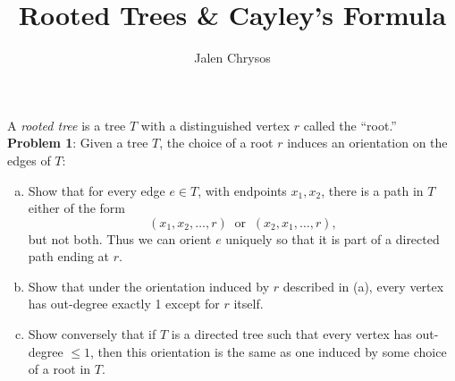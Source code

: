 \documentclass{amsart}
\author{Jalen Chrysos}
\title{Rooted Trees \& Cayley's Formula}
\begin{document}
	\maketitle 

%	
%	
%	
%	


	A \textit{rooted tree} is a tree $T$ with a distinguished vertex $r$ called the ``root.'' \\
	
	\noindent \textbf{Problem 1}: Given a tree $T$, the choice of a root $r$ induces an orientation on the edges of $T$: 
	\begin{enumerate}[(a)]
		\item Show that for every edge $e\in T$, with endpoints $x_1,x_2$, there is a path in $T$ either of the form
		$$(x_1,x_2,\dots,r) \;\; \text{or} \;\; (x_2,x_1,\dots,r),$$
		but not both. Thus we can orient $e$ uniquely so that it is part of a directed path ending at $r$.
		\item Show that under the orientation induced by $r$ described in (a), every vertex has out-degree exactly 1 except for $r$ itself.
		\item Show conversely that if $T$ is a directed tree such that every vertex has out-degree $\leq 1$, then this orientation is the same as one induced by some choice of a root in $T$.\\
	\end{enumerate} 
	
\end{document}
